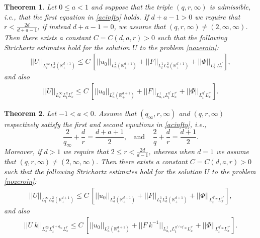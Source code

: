 \documentclass[10pt,a4paper]{amsart}
\newtheorem{theorem}{Theorem}
\def \RN {\mathbb{R}_+^{d+1}}
\begin{document}
\begin{theorem}\label{T:main}
Let $0\le a<1$ and suppose that the triple $(q,r,\infty)$ is admissible, i.e., that the first equation in \eqref{acinfty} holds. If $d+a-1>0$ we require that $r<\frac{2d}{d+a-1}$, if instead $d+a-1=0$, we assume that $(q,r,\infty)\not= (2,\infty,\infty)$.
 Then there exists a constant $C = C(d,a,r)>0$ such that the following Strichartz estimates hold for the solution $U$ to the problem \eqref{nozeroin}:
\begin{align}\label{Umain}
||U||_{L^\infty_t L^2_a(\RN)} \le C\ \left[||u_0||_{L^2_a(\RN)} + ||F||_{L^1_t L^2_{a}(\RN)} + ||\Phi||_{L^{q'}_t L^{r'}_x} \right],
\end{align}
and also
\begin{align}\label{Umain2}
||U||_{L^\infty_z L^q_t L^r_x } \le C\ \left[||u_0||_{L^2_a(\RN)} +  ||F||_{L^1_{a,z} L^{q'}_t L^{r'}_x } + ||\Phi||_{L^{q'}_t L^{r'}_x} \right].
\end{align}
\end{theorem}

\begin{theorem}\label{T:main2}
Let $-1<a<0$. Assume that $(q_\infty,r,\infty)$ and $(q,r,\infty)$ respectively satisfy the first and second equations in \eqref{acinfty}, i.e., 
\begin{equation}\label{uffaa}
\frac{2}{q_\infty} + \frac dr = \frac{d+a+1}2,\ \ \ \ \text{and}\ \ \ \ \ \frac 2{q} + \frac dr = \frac{d+1}2. 
\end{equation} 
Moreover, if $d>1$ we require that $2\le r < \frac{2d}{d-1}$, whereas when $d = 1$ we assume that $(q,r,\infty)\not= (2,\infty,\infty)$.
Then there exists a constant $C = C(d,a,r)>0$ such that the following Strichartz estimates hold for the solution $U$ to the problem \eqref{nozeroin}:
\begin{align}\label{Umain20}
||U||_{L^\infty_t L^2_a(\RN)} \le C\ \left[||u_0||_{L^2_a(\RN)} + ||F||_{L^1_t L^2_{a}(\RN)} + ||\Phi||_{L^{q'_\infty}_t L^{r'}_x} \right],
\end{align}
and also
\begin{align}\label{Umain22}
||U\ k||_{L^\infty_z L^{q+q_\infty}_t L^r_x } \le C\ \left[||u_0||_{L^2_a(\RN)} +  ||F \ k^{-1}||_{L^1_{a,z} L^{q'\cap q'_\infty}_t L^{r'}_x } + ||\Phi||_{L^{q'_\infty}_t L^{r'}_x} \right].
\end{align}
\end{theorem}
\end{document}
